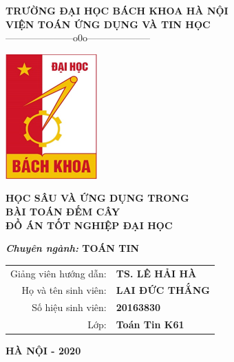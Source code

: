 \documentclass[a4paper, 12pt]{report}
\begin{document}
	\begin{titlepage} %


			\begin{center}
				
				{\large\bf TRƯỜNG ĐẠI HỌC BÁCH KHOA HÀ NỘI}\\
				
				{\large\bf VIỆN TOÁN ỨNG DỤNG VÀ TIN HỌC} \\
				
				{———————o0o——————–}
				\vskip 1cm
				\begin{center}
     				\includegraphics[scale=.85]{Images/biaDA.png}
				\end{center}
				\vskip 1cm
				

				{\Large\bf \textbf{HỌC SÂU
						VÀ ỨNG DỤNG TRONG\\ BÀI TOÁN ĐẾM CÂY\\
				}}
				\vskip 1cm
				{\bf ĐỒ ÁN TỐT NGHIỆP ĐẠI HỌC}
				
				
				{\bf {\it Chuyên ngành:} TOÁN TIN}\\
				
				\vskip 1cm
				
				\begin{tabular}{r l}
					
					Giảng viên hướng dẫn:&{\bf TS.  LÊ HẢI HÀ  }\\[0.5cm]
					
					Họ và tên sinh viên:&{\bf LAI ĐỨC THẮNG}\\[0.5cm]
					
					Số hiệu sinh viên:&{\bf 20163830}\\[0.5cm]
					Lớp:&{\bf Toán Tin K61}
					
				\end{tabular}
				
				\vfill
				
				{\bf HÀ NỘI - 2020}
				
			\end{center}
			
	\end{titlepage}
\end{document}
